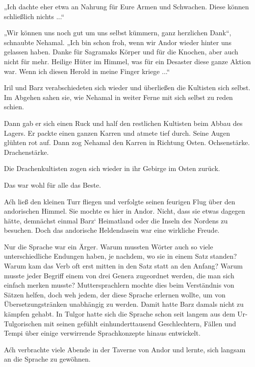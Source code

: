 „Ich dachte eher etwa an Nahrung für Eure Armen und Schwachen. Diese können schließlich nichts ...“

„Wir können uns noch gut um uns selbst kümmern, ganz herzlichen Dank“, schnaubte Nehamal. „Ich bin schon froh, wenn wir Andor wieder hinter uns gelassen haben. Danke für Sagramaks Körper und für die Knochen, aber auch nicht für mehr. Heilige Hüter im Himmel, was für ein Desaster diese ganze Aktion war. Wenn ich diesen Herold in meine Finger kriege ...“

Iril und Barz verabschiedeten sich wieder und überließen die Kultisten sich selbst. Im Abgehen sahen sie, wie Nehamal in weiter Ferne mit sich selbst zu reden schien.

Dann gab er sich einen Ruck und half den restlichen Kultisten beim Abbau des Lagers. Er packte einen ganzen Karren und atmete tief durch. Seine Augen glühten rot auf. Dann zog Nehamal den Karren in Richtung Osten. Ochsenstärke. Drachenstärke.

Die Drachenkultisten zogen sich wieder in ihr Gebirge im Osten zurück.

Das war wohl für alle das Beste.\bigskip







Aćh ließ den kleinen Turr fliegen und verfolgte seinen feurigen Flug über den andorischen Himmel. Sie mochte es hier in Andor. Nicht, dass sie etwas dagegen hätte, demnächst einmal Barz‘ Heimatland oder die Inseln des Nordens zu besuchen. Doch das andorische Heldendasein war eine wirkliche Freude.

Nur die Sprache war ein Ärger. Warum mussten Wörter auch so viele unterschiedliche Endungen haben, je nachdem, wo sie in einem Satz standen? Warum kam das Verb oft erst mitten in den Satz statt an den Anfang? Warum musste jeder Begriff einem von drei Genera zugeordnet werden, die man sich einfach merken musste? Muttersprachlern mochte dies beim Verständnis von Sätzen helfen, doch weh jedem, der diese Sprache erlernen wollte, um von Übersetzungstränken unabhängig zu werden. Damit hatte Barz damals nicht zu kämpfen gehabt. In Tulgor hatte sich die Sprache schon seit langem aus dem Ur-Tulgorischen mit seinen gefühlt einhunderttausend Geschlechtern, Fällen und Tempi über einige verwirrende Sprachkonzepte hinaus entwickelt.

Aćh verbrachte viele Abende in der Taverne von Andor und lernte, sich langsam an die Sprache zu gewöhnen.

